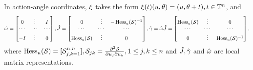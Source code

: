 \documentclass[notas.tex]{subfiles} 				%
\begin{document}
	In action-angle coordinates, $\xi$ takes the form $\xi(t)(u,\theta) = (u,\theta+t), t \in \mathbb{T}^n$,	and
	\begin{align*} \label{eq_sform_aa}
		\hat{\omega} = \begin{bmatrix}
			0 & \vdots & I\\
			\cdots & \cdots & \cdots \\
			-I & \vdots & 0
		\end{bmatrix},
		\hat{J} = \begin{bmatrix}
			0 & \vdots & -\operatorname{Hess}_u(\mathcal{S})^{-1}\\
			\cdots & \cdots & \cdots \\
			\operatorname{Hess}_u(\mathcal{S}) & \vdots & 0
		\end{bmatrix},
		\hat{\gamma} = \hat{\omega} \hat{J} = \begin{bmatrix}
			\operatorname{Hess}_u(\mathcal{S}) & \vdots & 0\\
			\cdots & \cdots & \cdots \\
			0 & \vdots & \operatorname{Hess}_u(\mathcal{S})^{-1}
		\end{bmatrix},
	\end{align*}
	where $\operatorname{Hess}_u(\mathcal{S}) = [\mathcal{S}_{j,k = 1}^{n,n}],  \mathcal{S}_{jk}=\frac{\partial^2 \mathcal{S}}{\partial u_j \partial u_k}, 1 \leq j,k \leq n$ and $\hat {J}, \hat {\gamma}$ and $\hat {\omega}$ are local matrix representations.
\end{document}
